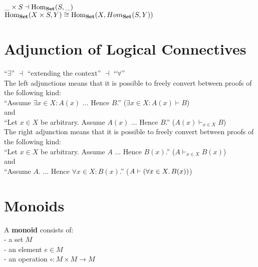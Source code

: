\documentclass[a4paper, twoside, english, 11pt]{book}
\DeclareMathOperator{\Hom}{Hom}
\newcommand{\catname}[1]{{\normalfont\textbf{#1}}}
\newcommand{\Set}{\catname{Set}}
\begin{document}
$\_ \times S \dashv \Hom_\Set(S, \_)$ \\

\noindent
$\Hom_\Set(X \times S, Y) \cong \Hom_\Set(X, Hom_\Set(S, Y))$



\section{Adjunction of Logical Connectives}

``$\exists$'' $\dashv$ ``extending the context'' $\dashv$ ``$\forall$'' \\

\noindent
The left adjunctions means that it is possible to freely convert between proofs of the following kind: \\

``Assume $\exists x \in X : A(x)$ ... Hence $B$.'' ($\exists x \in X : A(x) \vdash B$) \\

\noindent
and \\

``Let $x \in X$ be arbitrary. Assume $A(x)$ ... Hence $B$.'' ($A(x) \vdash_{x \in X} B$) \\

\noindent
The right adjunction means that it is possible to freely convert between proofs of the following kind: \\

``Let $x \in X$ be arbitrary. Assume $A$ ... Hence $B(x)$.'' ($A \vdash_{x \in X} B(x)$) \\

\noindent
and \\

``Assume $A$. ... Hence $\forall x \in X : B(x)$.'' ($A \vdash (\forall x \in X \ldotp B(x))$)



\section{Monoids}

A \textbf{monoid} consists of: \\

- a set $M$ \\

- an element $e \in M$ \\

- an operation $\circ : M \times M \rightarrow M$ \\
\end{document}
